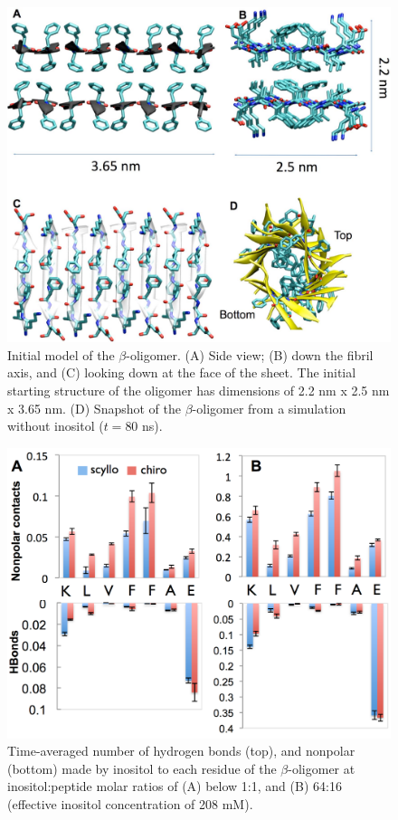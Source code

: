 \begin{figure}[ht]
\centering
\includegraphics[width=15.15cm]{figures/appendixA/inos2_figures_SI_betaInitialModel.pdf}
\caption[Initial model of the $\beta$-oligomer]{Initial model of the $\beta$-oligomer. (A) Side view; (B) down the fibril axis, and (C) looking down at the face of the sheet. The initial starting structure of the oligomer has dimensions of 2.2 nm x 2.5 nm x 3.65 nm. (D) Snapshot of the $\beta$-oligomer from a simulation without inositol ($t=80$ ns).}
\label{fig:SI-betaInitialModel}
\end{figure}

\begin{figure}[ht]
\centering
\includegraphics[width=15.15cm]{figures/appendixA/inos2_figures_SI_betaBinding.pdf}
\caption[Time-averaged number of hydrogen bonds and nonpolar made by inositol to each residue of the $\beta$-oligomer]{Time-averaged number of hydrogen bonds (top), and nonpolar (bottom) made by inositol to each residue of the $\beta$-oligomer at inositol:peptide molar ratios of (A) below 1:1, and (B) 64:16 (effective inositol concentration of 208 mM).}
\label{fig:SI-betaBinding}
\end{figure}